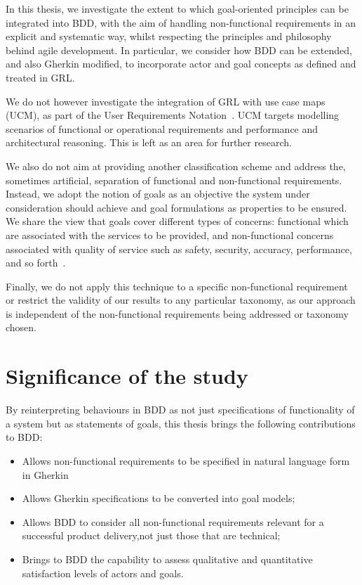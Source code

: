 \documentclass[dissertation,final]{softeng}
\newcommand{\nfrs}{non-functional requirements\xspace}
\begin{document}
In this thesis, we investigate the extent to which goal-oriented principles can be integrated into BDD, with the aim of handling non-functional requirements in an explicit and systematic way, whilst respecting the principles and philosophy behind agile development. In particular, we consider how BDD can be extended, and also Gherkin modified, to incorporate actor and goal concepts as defined and treated in GRL.

We do not however investigate the integration of GRL with use case maps (UCM), as part of the User Requirements Notation~\citep{liu2004designing}. UCM targets modelling scenarios of functional or operational requirements and performance and architectural reasoning. This is left as an area for further research.

We also do not aim at providing another classification scheme and address the, sometimes artificial, separation of functional and non-functional requirements. Instead, we adopt the notion of goals as an objective the system under consideration should achieve and goal formulations as properties to be ensured. We share the view that goals cover different types of concerns: functional which are associated with the services to be provided, and non-functional concerns associated with quality of service such as safety, security, accuracy, performance, and so forth~\citep{Lamsweerde:2001wpba}.

Finally, we do not apply this technique to a specific non-functional requirement or restrict the validity of our results to any particular taxonomy, as our approach is independent of the \nfrs being addressed or taxonomy chosen.

\section{Significance of the study}

By reinterpreting behaviours in BDD as not just specifications of functionality of a system but as statements of goals, this thesis brings the following contributions to BDD:

\begin{center}
\begin{itemize}
\item Allows non-functional requirements to be specified in natural language form in Gherkin
\item Allows Gherkin specifications to be converted into goal models;
\item Allows BDD to consider all non-functional requirements relevant for a successful product delivery,not just those that are technical;
\item Brings to BDD the capability to assess qualitative and quantitative satisfaction levels of actors and goals.
\end{itemize}
\end{center}
\end{document}
